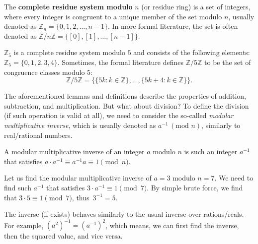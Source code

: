 \documentclass[../lecture-notes-148x210.tex]{subfiles}
\begin{document}
\begin{definition}
    The \textbf{complete residue system modulo} $n$ (or residue ring) is a set of integers, 
    where every integer is congruent to a unique member of the set modulo $n$, usually 
    denoted as $\mathbb{Z}_n = \{0, 1, 2, \dots, n-1\}$. 
    In more formal literature, the set is often denoted as $\mathbb{Z}/n\mathbb{Z} = \{ [0], [1], \ldots, [n-1] \}$.
\end{definition}

\begin{example}
    $\mathbb{Z}_{5}$ is a complete residue system modulo $5$ and consists of the
    following elements: $\mathbb{Z}_5 = \{0, 1, 2, 3, 4\}$. Sometimes, the formal literature 
    defines $\mathbb{Z}/5\mathbb{Z}$ to be the set of congruence classes modulo $5$:
    \begin{equation*}
        \mathbb{Z}/5\mathbb{Z} = \{ \{5k: k \in \mathbb{Z}\}, \dots, \{5k+4: k \in \mathbb{Z}\}\}.
    \end{equation*}
\end{example}

The aforementioned lemmas and definitions describe the properties of addition, subtraction, and multiplication. But what about division? To define the division (if such operation is valid at all), we need to consider the so-called \emph{modular multiplicative inverse}, which is usually denoted as $a^{-1} \, (\text{mod } n)$, similarly to real/rational numbers.

\begin{definition}
    A modular multiplicative inverse of an integer $a$ modulo $n$ is such an integer $a^{-1}$ that satisfies $a \cdot a^{-1} \equiv a^{-1}a \equiv 1 \pmod{n}$.
\end{definition}

\begin{example}
    Let us find the modular multiplicative inverse of $a = 3$ modulo $n = 7$.
    We need to find such $a^{-1}$ that satisfies $3 \cdot a^{-1} \equiv 1 \pmod{7}$.
    By simple brute force, we find that $3 \cdot 5 \equiv 1 \pmod{7}$, thus~$3^{-1} = 5$.
\end{example}

\begin{remark}
    The inverse (if exists) behaves similarly to the usual inverse over rations/reals. For example, $(a^{2})^{-1} = (a^{-1})^{2}$, which means, we can first find the inverse, then the squared value, and vice versa.
\end{remark}
\end{document}
